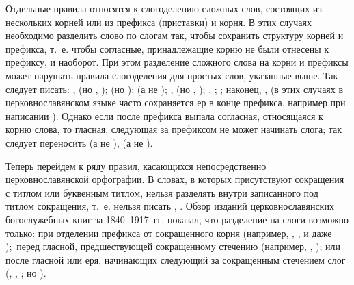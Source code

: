 \documentclass[12pt,a4paper,oneside]{extarticle}
\begin{document}
Отдельные правила относятся к слогоделению сложных слов, состоящих из нескольких корней или из префикса (приставки) и корня. В этих случаях необходимо разделить слово по слогам так, чтобы сохранить структуру корней и префикса, т.~е. чтобы согласные, принадлежащие корню не были отнесены к префиксу, и наоборот. При этом разделение сложного слова на корни и префиксы может нарушать правила слогоделения для простых слов, указанные выше. Так следует писать: ,  (но , );  (но );  (а не ); ,  (но  , ); , ; ; наконец, ,  (в этих случаях в церковнославянском языке часто сохраняется ер в конце префикса, например при написании ). Однако если после префикса выпала согласная, относящаяся к корню слова, то гласная, следующая за префиксом не может начинать слога; так следует переносить  (а не ),  (а не ).

Теперь перейдем к ряду правил, касающихся непосредственно церковнославянской орфографии. В словах, в которых присутствуют сокращения с титлом или буквенным титлом, нельзя разделять внутри записанного под титлом сокращения, т.~е. нельзя писать , . Обзор изданий церковнославянских богослужебных книг за 1840--1917~гг. показал, что разделение на слоги возможно только: при отделении префикса от сокращенного корня (например, , ,  и даже ); перед гласной, предшествующей сокращенному стечению (например, , ); или после гласной или еря, начинающих следующий за сокращенным стечением слог (, , ; но ).
\end{document}
